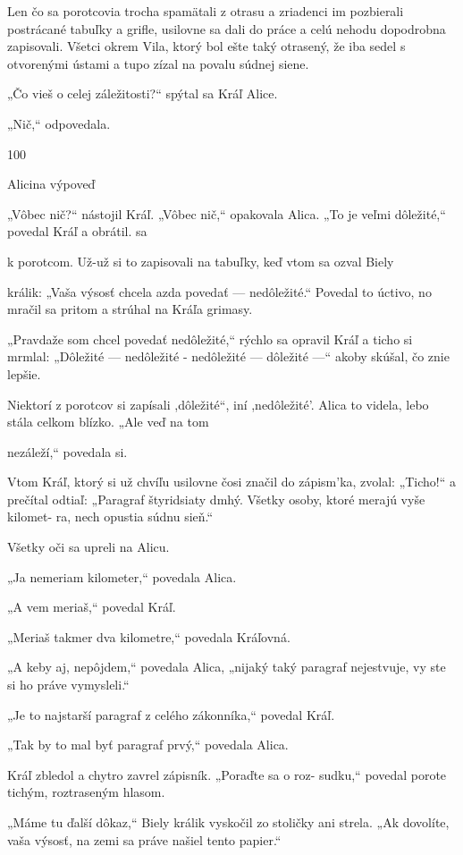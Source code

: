 \documentclass[12pt]{book}
\begin{document}
\begin{Parallel}[p]{}{}
{Len čo sa porotcovia trocha spamätali z otrasu a zriadenci
im pozbierali postrácané tabuľky a grifle, usilovne sa dali do
práce a celú nehodu dopodrobna zapisovali. Všetci okrem
Vila, ktorý bol ešte taký otrasený, že iba sedel s otvorenými
ústami a tupo zízal na povalu súdnej siene.

„Čo vieš o celej záležitosti?“ spýtal sa Kráľ Alice.

„Nič,“ odpovedala.

100

Alicina výpoveď

„Vôbec nič?“ nástojil Kráľ.
„Vôbec nič,“ opakovala Alica.
„To je veľmi dôležité,“ povedal Kráľ a obrátil. sa

k porotcom.
Už-už si to zapisovali na tabuľky, keď vtom sa ozval Biely

králik: „Vaša výsosť chcela azda povedať — nedôležité.“
Povedal to úctivo, no mračil sa pritom a strúhal na Kráľa
grimasy.

„Pravdaže som chcel povedať nedôležité,“ rýchlo sa
opravil Kráľ a ticho si mrmlal: „Dôležité — nedôležité
- nedôležité — dôležité —“ akoby skúšal, čo znie lepšie.

Niektorí z porotcov si zapísali ,dôležité“, iní ,nedôležité'.
Alica to videla, lebo stála celkom blízko. „Ale veď na tom

nezáleží,“ povedala si.

Vtom Kráľ, ktorý si už chvíľu usilovne čosi značil do
zápism'ka, zvolal: „Ticho!“ a prečítal odtiaľ: „Paragraf
štyridsiaty dmhý. Všetky osoby, ktoré merajú vyše kilomet-
ra, nech opustia súdnu sieň.“

Všetky oči sa upreli na Alicu.

„Ja nemeriam kilometer,“ povedala Alica.

„A vem meriaš,“ povedal Kráľ.

„Meriaš takmer dva kilometre,“ povedala Kráľovná.

„A keby aj, nepôjdem,“ povedala Alica, „nijaký taký
paragraf nejestvuje, vy ste si ho práve vymysleli.“

„Je to najstarší paragraf z celého zákonníka,“ povedal
Kráľ.

„Tak by to mal byť paragraf prvý,“ povedala Alica.

Kráľ zbledol a chytro zavrel zápisník. „Poraďte sa o roz-
sudku,“ povedal porote tichým, roztraseným hlasom.

„Máme tu ďalší dôkaz,“ Biely králik vyskočil zo stoličky
ani strela. „Ak dovolíte, vaša výsosť, na zemi sa práve našiel
tento papier.“

}
\end{Parallel}
\end{document}

